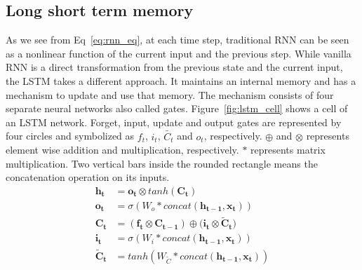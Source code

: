 \documentclass[10pt,twocolumn,letterpaper]{article}
\begin{document}
\subsection{Long short term memory} \label{lstm_sec}
As we see from Eq~\ref{eq:rnn_eq}, at each time step, traditional RNN can be 
seen as a nonlinear function of the current input and the previous step. While vanilla RNN is a 
direct transformation from the previous state and the current input, the 
LSTM takes a different approach. It maintains an internal memory and  has a 
mechanism to update and use that memory. The mechanism consists of four separate neural networks also 
called gates. Figure~\ref{fig:lstm_cell} shows a cell of an LSTM network.
Forget, input, update and output gates are represented by four circles and symbolized as $f_t$, $i_t$, $\tilde{C_t}$ and $o_t$, respectively. $\oplus$ and $\otimes$ represents element wise addition and multiplication, 
respectively. $*$ represents matrix multiplication. Two vertical bars inside the rounded rectangle means the 
concatenation operation on its inputs. 
\begin{equation}
\label{eq:lstm_eq}
	\begin{aligned}
		\mathbf{h_t} &= \mathbf{o_t} \otimes tanh(\mathbf{C_t}) \\
		\mathbf{o_t} &= \sigma(W_o * concat(\mathbf{h_{t-1}}, \mathbf{x_t})) \\
		\mathbf{C_t} &= (\mathbf{f_t} \otimes \mathbf{C_{t-1}}) \oplus (\mathbf{i_t} \otimes \mathbf{\tilde{C}_t)}  \\
		\mathbf{i_t} &= \sigma(W_i * concat(\mathbf{h_{t-1}}, \mathbf{x_t})) \\
		\mathbf{\tilde{C}_t} &= tanh(W_{\tilde{C}} * concat(\mathbf{h_{t-1}}, \mathbf{x_t}))
	\end{aligned}
\end{equation}
\end{document}
